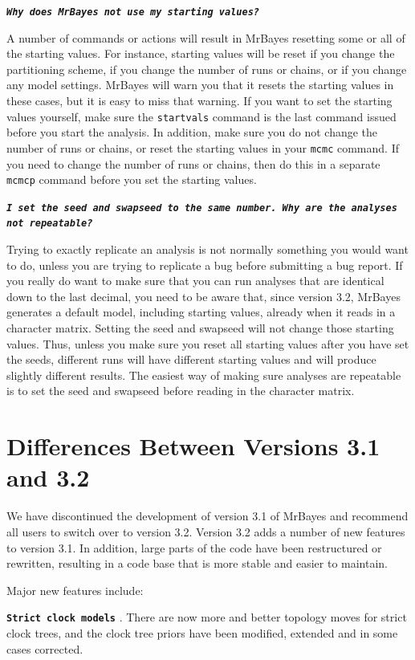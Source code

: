 \documentclass[12pt]{book}
\newcommand{\ttt}[1]{\texttt{#1} }
\newcommand{\tb}[1]{\texttt{\textbf{#1}} }
\begin{document}
\tb{\it{Why does MrBayes not use my starting values?}}

A number of commands or actions will result in MrBayes resetting some or all of the starting values. For
instance, starting values will be reset if you change the partitioning scheme, if you change the number
of runs or chains, or if you change any model settings. MrBayes will warn you that it resets the starting
values in these cases, but it is easy to miss that warning. If you want to set the starting values yourself,
make sure the \ttt{startvals} command is the last command issued before you start the analysis. In addition,
make sure you do not change the number of runs or chains, or reset the starting values in your \texttt{mcmc}
command. If you need to change the number of runs or chains, then do this in a separate \ttt{mcmcp}
command before you set the starting values.

\tb{\it{I set the seed and swapseed to the same number. Why are the analyses not repeatable?}}

Trying to exactly replicate an analysis is not normally something you would want to do, unless you
are trying to replicate a bug before submitting a bug report. If you really do want to make sure that
you can run analyses that are identical down to the last decimal, you need to be aware that,
since version 3.2, MrBayes generates a default model, including starting values, already when it reads
in a character matrix. Setting the seed and swapseed will not change those starting values. Thus, unless
you make sure you reset all starting values after you have set the seeds, different runs will have different
starting values and will produce slightly different results. The easiest way of making sure analyses are
repeatable is to set the seed and swapseed before reading in the character matrix.

\section{Differences Between Versions 3.1 and 3.2}

We have discontinued the development of version 3.1 of MrBayes and recommend all
users to switch over to version 3.2. Version 3.2 adds a number of new features to
version 3.1. In addition, large parts of the code have been restructured or rewritten,
resulting in a code base that is more stable and easier to maintain.

Major new features include:

\tb{Strict clock models}. There are now more and better topology moves for strict clock
trees, and the clock tree priors have been modified, extended and in some cases corrected.
\end{document}
